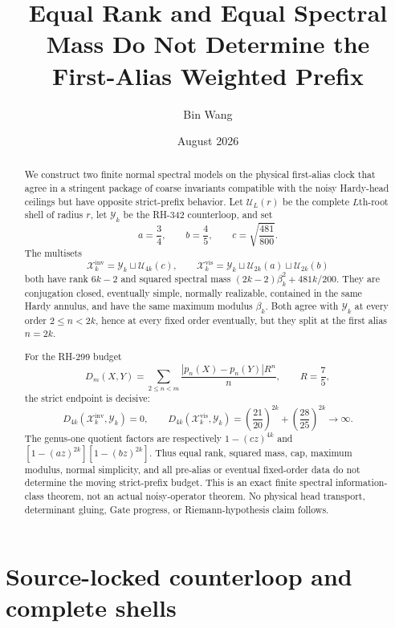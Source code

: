 \documentclass[11pt]{article}
\title{Equal Rank and Equal Spectral Mass Do Not Determine the\\
First-Alias Weighted Prefix}
\author{Bin Wang}
\date{August 2026}
\theoremstyle{remark}
\newcommand{\inv}{\mathrm{inv}}
\newcommand{\vis}{\mathrm{vis}}
\begin{document}
\maketitle

\begin{abstract}
We construct two finite normal spectral models on the physical first-alias
clock that agree in a stringent package of coarse invariants compatible with
the noisy Hardy-head ceilings but have opposite strict-prefix behavior.  Let
$\mathcal U_L(r)$ be the complete $L$th-root shell of radius $r$, let
$\mathcal Y_k$ be the RH-342 counterloop, and set
\[
 a=\frac34,\qquad b=\frac45,\qquad
 c=\sqrt{\frac{481}{800}}.
\]
The multisets
\[
 \mathcal X_k^{\inv}=\mathcal Y_k\sqcup\mathcal U_{4k}(c),
 \qquad
 \mathcal X_k^{\vis}=\mathcal Y_k\sqcup
 \mathcal U_{2k}(a)\sqcup\mathcal U_{2k}(b)
\]
both have rank $6k-2$ and squared spectral mass
$(2k-2)\beta_k^2+481k/200$.  They are conjugation closed, eventually
simple, normally realizable, contained in the same Hardy annulus, and have
the same maximum modulus $\beta_k$.  Both agree with $\mathcal Y_k$ at every
order $2\le n<2k$, hence at every fixed order eventually, but they split at
the first alias $n=2k$.

For the RH-299 budget
\[
 D_m(X,Y)=\sum_{2\le n<m}\frac{|p_n(X)-p_n(Y)|R^n}{n},
 \qquad R=\frac75,
\]
the strict endpoint is decisive:
\[
 D_{4k}(\mathcal X_k^{\inv},\mathcal Y_k)=0,
 \qquad
 D_{4k}(\mathcal X_k^{\vis},\mathcal Y_k)
 =\left(\frac{21}{20}\right)^{2k}
  +\left(\frac{28}{25}\right)^{2k}\longrightarrow\infty.
\]
The genus-one quotient factors are respectively $1-(cz)^{4k}$ and
$[1-(az)^{2k}][1-(bz)^{2k}]$.  Thus equal rank, squared mass, cap, maximum
modulus, normal simplicity, and all pre-alias or eventual fixed-order data do
not determine the moving strict-prefix budget.  This is an exact finite
spectral information-class theorem, not an actual noisy-operator theorem.
No physical head transport, determinant gluing, Gate progress, or
Riemann-hypothesis claim follows.
\end{abstract}

\section{Source-locked counterloop and complete shells}
\end{document}
